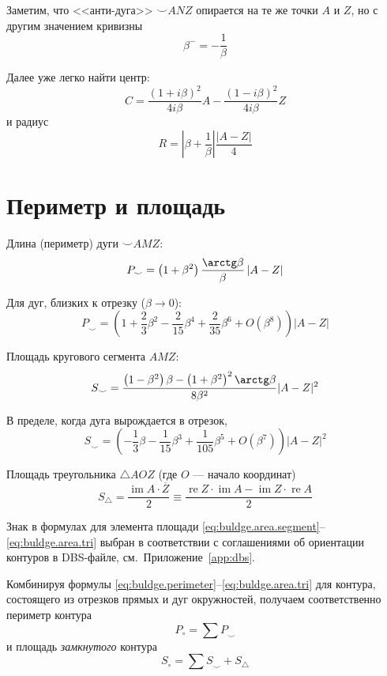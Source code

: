 Заметим, что <<анти-дуга>>
${\smile} ANZ$
опирается на те же точки
$A$ и $Z$,
но с другим значением кривизны
$$
\beta^- = -\frac{1}{\beta}
$$

Далее уже легко найти центр:
$$
C =
\frac{(1+i\beta)^2}{4i\beta}A
-
\frac{(1-i\beta)^2}{4i\beta}Z
$$
и радиус
$$
R = \left| \beta + \frac{1}\beta \right|
\frac{\left|A-Z \right|}4
$$

\section*{Периметр и площадь}

Длина
(периметр)
дуги
${\smile}AMZ$:
\begin{equation}
  \label{eq:buldge.perimeter}
  P_{\smile} =
  \left(1+\beta^2 \right)
  \frac{\arctg \beta}{\beta}
  \left| A - Z \right|
\end{equation}

Для дуг, близких к отрезку
($\beta \to 0$):
$$
P_{\smile} =
 \left(1+\frac{2}{3}\beta^2 - \frac{2}{15}\beta^4 + \frac{2}{35}\beta^6 +O(\beta^8)\right)
 \left| A - Z \right|
$$

Площадь кругового сегмента
$AMZ$:
\begin{equation}
  \label{eq:buldge.area.segment}
  S_{\smile}=
  \frac{\left(1 - \beta^2\right) \beta - \left(1+\beta^2\right)^2\arctg \beta}{8\beta^2}
  |A-Z|^2
\end{equation}

В пределе,
когда дуга вырождается в отрезок,
$$
S_{\smile}=
  \left(
    -\frac{1}{3} \beta - \frac{1}{15}\beta^3 +\frac{1}{105}\beta^5 + O(\beta^7)
  \right)|A-Z|^2
$$

Площадь треугольника
$\triangle AOZ$
(где $O$ --- начало координат)
\begin{equation}
  \label{eq:buldge.area.tri}
  S_{\triangle} =
  \frac{\operatorname{im}A\cdot\overline Z}{2}
  \equiv
  \frac{\operatorname{re} Z \cdot \operatorname{im} A - \operatorname{im} Z \cdot \operatorname{re} A}2
\end{equation}

Знак в формулах для элемента площади
\eqref{eq:buldge.area.segment}--\eqref{eq:buldge.area.tri}
выбран в соответствии с соглашениями об ориентации контуров
в DBS-файле,
см.~Приложение~\ref{app:dbs}.

Комбинируя формулы
\eqref{eq:buldge.perimeter}--\eqref{eq:buldge.area.tri}
для контура,
состоящего из отрезков прямых и дуг окружностей,
получаем соответственно периметр контура
$$
P_{\circ} =  \sum P_{\smile}
$$
и площадь
\textit{замкнутого}
контура
$$
S_{\circ} = \sum S_{\smile} + S_{\triangle}
$$

